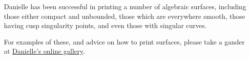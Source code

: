 Danielle has been successful in printing a number of algebraic surfaces, including those either compact and unbounded, those which are everywhere
smooth, those having cusp singularity points, and even those with singular
curves.

For examples of these, and advice on how to print surfaces, please take a gander at \href{http://www.danibrake.org/gallery/}{Danielle's online gallery}.

